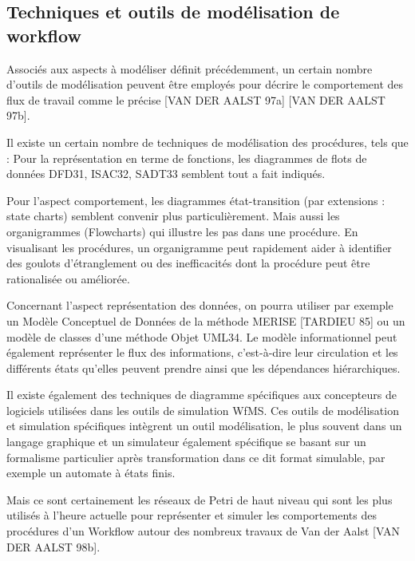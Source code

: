 





















\subsection{Techniques et outils de modélisation de workflow}

Associés aux aspects à modéliser définit précédemment, un certain nombre d’outils de modélisation peuvent être employés pour décrire le comportement des flux de travail comme le précise [VAN DER AALST 97a] [VAN DER AALST 97b].

Il existe un certain nombre de techniques de modélisation des procédures, tels que : Pour la représentation en terme de fonctions, les diagrammes de flots de données DFD31, ISAC32, SADT33 semblent tout a fait indiqués.  


Pour l’aspect comportement, les diagrammes état-transition (par extensions : state charts) semblent convenir plus particulièrement. Mais aussi les organigrammes (Flowcharts) qui illustre les pas dans une procédure. En visualisant les procédures, un organigramme peut rapidement aider à identifier des goulots d'étranglement ou des inefficacités dont la procédure peut être rationalisée ou améliorée. 

Concernant l’aspect représentation des données, on pourra utiliser par exemple un Modèle Conceptuel de Données de la méthode MERISE [TARDIEU 85] ou un modèle de classes d’une méthode Objet UML34. Le modèle informationnel peut également représenter le flux des informations, c’est-à-dire leur circulation et les différents états qu’elles peuvent prendre ainsi que les dépendances hiérarchiques.

Il existe également des techniques de diagramme spécifiques aux concepteurs de logiciels utilisées dans les outils de simulation WfMS. Ces outils de modélisation et simulation spécifiques intègrent un outil modélisation, le plus souvent dans un langage graphique et un simulateur également spécifique se basant sur un formalisme particulier après transformation dans ce dit format simulable, par exemple un automate à états finis. 


Mais ce sont certainement les réseaux de Petri de haut niveau qui sont les plus utilisés à l’heure actuelle pour représenter et simuler les comportements des procédures d’un Workflow autour des nombreux travaux de Van der Aalst [VAN DER AALST 98b]. 

